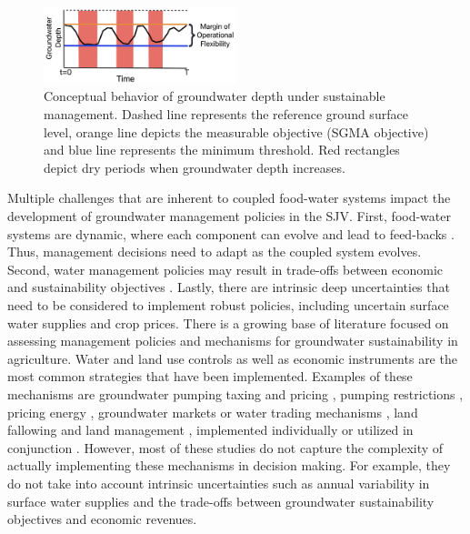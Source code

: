 \documentclass[a4paper,fleqn]{cas-sc}
\begin{document}
 \begin{figure}[ht]
    \includegraphics[width=0.5\textwidth,center]{conceptual_sgma_policy.jpg}
    \caption{Conceptual behavior of groundwater depth under sustainable management. Dashed line represents the reference ground surface level, orange line depicts the measurable objective (SGMA objective) and blue line represents the minimum threshold. Red rectangles depict dry periods when groundwater depth increases.}
    \label{fig:1}
\end{figure}

Multiple challenges that are inherent to coupled food-water systems \citep{polhill_modelling_2016} impact the development of groundwater management policies in the SJV. First, food-water systems are dynamic, where each component can evolve and lead to feed-backs \citep{filatova_regime_2016}. Thus, management decisions need to adapt as the coupled system evolves. Second, water management policies may result in trade-offs between economic and sustainability objectives \citep{mcdermid_minimizing_2021,stone_economic_2022,torhan_tradeoffs_2022,null_pareto_2021}. Lastly, there are intrinsic deep uncertainties \citep{stirling_keep_2010} that need to be considered to implement robust policies, including uncertain surface water supplies and crop prices. There is a growing base of literature focused on assessing management policies and mechanisms for groundwater sustainability in agriculture. Water and land use controls as well as economic instruments are the most common strategies that have been implemented. Examples of these mechanisms are groundwater pumping taxing and pricing  \citep{madani_exogenous_2013,mulligan_assessing_2014,stone_economic_2022,wang_development_2023}, pumping restrictions \citep{young_hydrologic-economic_2021,lan_performance_2021,macewan_hydroeconomic_2017,rodriguez-flores_global_2022,wang_development_2023}, pricing energy \citep{hrozencik_impacts_2022}, groundwater markets or water trading mechanisms \citep{khan_effect_2019,kuwayama_regulation_2013,safari_market-based_2023}, land fallowing \citep{van_schmidt_linkages_2022} and land management \citep{bourque_balancing_2019,li_evaluation_2018,bryant_shaping_2020}, implemented individually or utilized in conjunction \citep{graveline_combining_2020,hrozencik_heterogeneous_2017}. However, most of these studies do not capture the complexity of actually implementing these mechanisms in decision making. For example, they do not take into account intrinsic uncertainties such as annual variability in surface water supplies and the trade-offs between groundwater sustainability objectives and economic revenues. 
\end{document}
